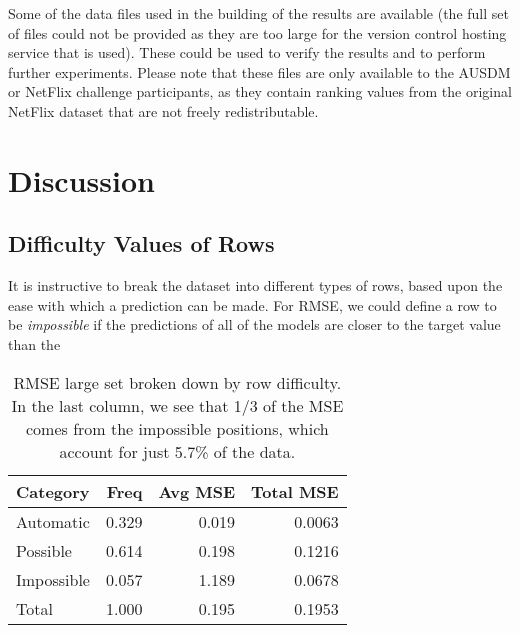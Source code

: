 \documentclass{article}
\begin{document}
Some of the data files used in the building of the results are available (the full set of files could not be provided as they are too large for the version control hosting service that is used).  These could be used to verify the results and to perform further experiments.  Please note that these files are only available to the AUSDM or NetFlix challenge participants, as they contain ranking values from the original NetFlix dataset that are not freely redistributable.

\section{Discussion}

\subsection{Difficulty Values of Rows}

It is instructive to break the dataset into different types of rows, based upon the ease with which a prediction can be made.  For RMSE, we could define a row to be \emph{impossible} if the predictions of all of the models are closer to the target value than the

\begin{table}[t]
\caption{RMSE large set broken down by row difficulty.  In the last column, we see that 1/3 of the MSE comes from the impossible positions, which account for just 5.7\% of the data.}
\label{rowtypesrmse}
\vskip 0.15in
\begin{center}
\begin{small}
\begin{sc}
\begin{tabular}{lrrr}
\hline
\abovespace\belowspace
Category & Freq & Avg MSE & Total MSE \\
\hline
\abovespace
Automatic     & 0.329 & 0.019 & 0.0063 \\
Possible      & 0.614 & 0.198 & 0.1216 \\
\belowspace
Impossible    & 0.057 & 1.189 & 0.0678 \\
\hline
Total         & 1.000 & 0.195 & 0.1953 \\
\hline
\end{tabular}
\end{sc}
\end{small}
\end{center}
\vskip -0.1in
\end{table}
\end{document}
